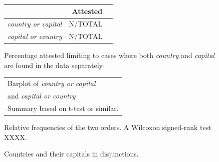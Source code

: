 \documentclass{article}
\begin{document}
\begin{figure}[tp]
  \centering
  \begin{subtable}{0.45\textwidth}
    \begin{tabular}[c]{r r r}    
      \toprule
      & Attested  \\
      \midrule
      \emph{country or capital}  & N/TOTAL \\
      \emph{capital or country}  & N/TOTAL \\
      \bottomrule
    \end{tabular}
    \caption{Percentage attested limiting to cases where both
      \emph{country} and \emph{capital} are found in the data
      separately.}
  \end{subtable}
  \hfill
  \begin{subtable}{0.45\textwidth}
    \begin{tabular}[c]{l}
      Barplot of \emph{country or capital} \\
      and \emph{capital or country}\\
      Summary based on t-test or similar.
    \end{tabular}
    \caption{Relative frequencies of the two orders. A Wilcoxon
      signed-rank test XXXX.}      
  \end{subtable}
  \caption{Countries and their capitals in disjunctions.}
  \label{fig:capitals}
\end{figure}
\end{document}
